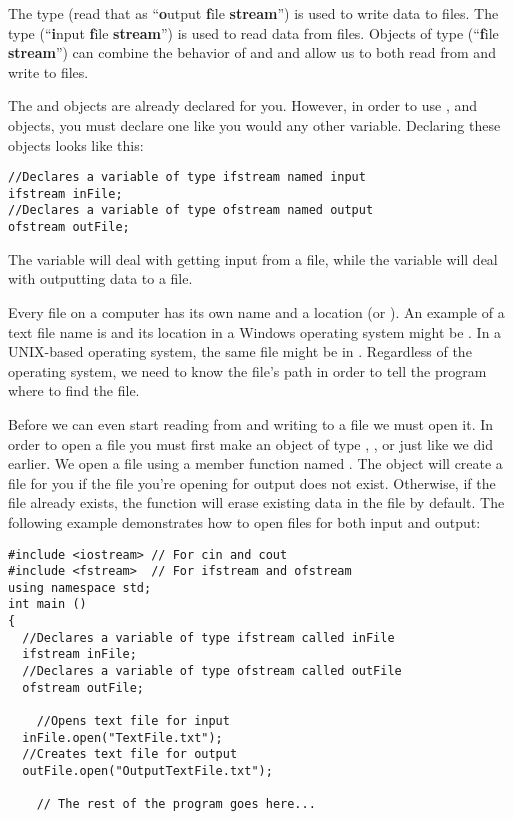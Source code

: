 The  type (read that as ``\textbf{o}utput \textbf{f}ile \textbf{stream}'') is used to write data to files. 
The  type (``\textbf{i}nput \textbf{f}ile \textbf{stream}'') is used to read data from files. 
Objects of type  (``\textbf{f}ile \textbf{stream}'') can combine the behavior of  and  and allow us to both read from and write to files.

The  and  objects are already declared for you. 
However, in order to use ,  and  objects, you must declare one like you would any other variable. 
Declaring these objects looks like this:

\noindent\begin{minipage}{\linewidth}\begin{lstlisting}
//Declares a variable of type ifstream named input
ifstream inFile; 
//Declares a variable of type ofstream named output
ofstream outFile; 
\end{lstlisting}\end{minipage}

The variable  will deal with getting input from a file, while the variable  will deal with outputting data to a file. 

Every file on a computer has its own name and a location (or ).
An example of a text file name is  and its location in a Windows operating system might be . 
In a UNIX-based operating system, the same file might be in . 
Regardless of the operating system, we need to know the file's path in order to tell the program where to find the file. 


Before we can even start reading from and writing to a file we must open it. 
In order to open a file you must first make an object of type , , or  just like we did earlier. 
We open a file using a member function named . 
The  object will create a file for you if the file you're opening for output does not exist.
Otherwise, if the file already exists, the  function will erase existing data in the file by default. 
The following example demonstrates how to open files for both input and output:

\noindent\begin{minipage}{\linewidth}\begin{lstlisting}
#include <iostream> // For cin and cout 
#include <fstream>  // For ifstream and ofstream
using namespace std;
int main ()
{
  //Declares a variable of type ifstream called inFile
  ifstream inFile; 
  //Declares a variable of type ofstream called outFile
  ofstream outFile; 
	
	//Opens text file for input
  inFile.open("TextFile.txt"); 
  //Creates text file for output
  outFile.open("OutputTextFile.txt"); 
	
	// The rest of the program goes here...
\end{lstlisting}\end{minipage}

